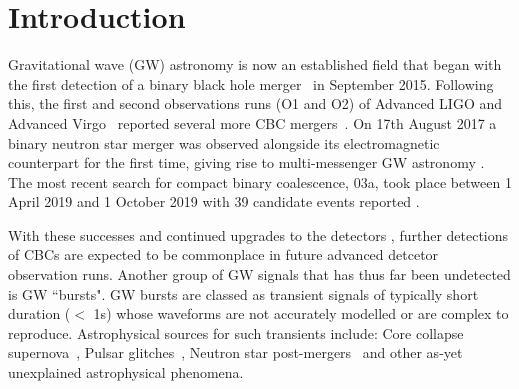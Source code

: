 \documentclass[12pt]{iopart}
\begin{document}
\section{Introduction}

%
Gravitational wave (GW) astronomy is now an established field that began with the first detection of a binary black hole merger~\cite{Abbott2016} in September 2015. Following this, the first and second observations runs (O1 and O2) of Advanced LIGO and Advanced Virgo~\cite{Prospects-dets, AdvLIGO, AdvLIGO2, AdvVIRGO} reported several more \ac{CBC} mergers~\cite{Abbott2016a, Abbott2017, Abbott2017a}. On 17th August 2017 a binary neutron star merger was observed alongside its electromagnetic counterpart for the first time, giving rise to multi-messenger GW astronomy \cite{Abbott2017b}. The most recent search for compact binary coalescence, 03a, took place between 1 April 2019 and 1 October 2019 with 39 candidate events reported \cite{GWTC2:2020}.  

%
With these successes and continued upgrades to the detectors \cite{det-upgrades1,det-upgrades2}, further
detections of \acp{CBC} are expected to be commonplace in future advanced
detcetor observation runs. Another group of GW signals that has thus far
been undetected is GW ``bursts". GW bursts are classed as transient
signals of typically short duration ($<$ 1s) whose waveforms are not accurately
modelled or are complex to reproduce. Astrophysical sources for such transients
include: Core collapse supernova~\cite{Fryer_2003}, Pulsar
glitches~\cite{Andersson_2001}, Neutron star post-mergers~\cite{Baiotti_2007}
and other as-yet unexplained astrophysical phenomena. 
\end{document}
